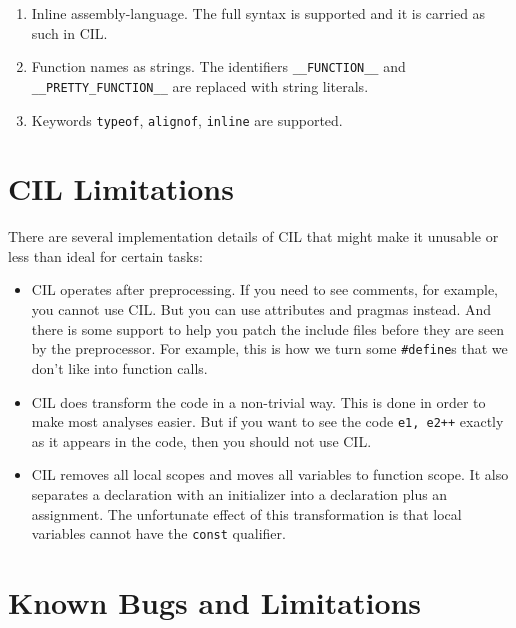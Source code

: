 \documentclass[letterpaper]{article}
\def\t#1{{\tt #1}}
\begin{document}
\begin{enumerate}
\item Inline assembly-language. The full syntax is supported and it is carried
as such in CIL.

\item Function names as strings. The identifiers \t{\_\_FUNCTION\_\_} and
\t{\_\_PRETTY\_FUNCTION\_\_} are replaced with string literals. 

\item Keywords \t{typeof}, \t{alignof}, \t{inline} are supported. 
\end{enumerate}

\section{CIL Limitations}

 There are several implementation details of CIL that might make it unusable
 or less than ideal for certain tasks:

\begin{itemize}
\item CIL operates after preprocessing. If you need to see comments, for
example, you cannot use CIL. But you can use attributes and pragmas instead.
And there is some support to help you patch the include files before they are
seen by the preprocessor. For example, this is how we turn some
\t{\#define}s that we don't like into function calls. 

\item CIL does transform the code in a non-trivial way. This is done in order
to make most analyses easier. But if you want to see the code \t{e1, e2++}
exactly as it appears in the code, then you should not use CIL. 

\item CIL removes all local scopes and moves all variables to function
scope. It also separates a declaration with an initializer into a declaration
plus an assignment. The unfortunate effect of this transformation is that
local variables cannot have the \t{const} qualifier.

\end{itemize}
 
\section{Known Bugs and Limitations}
\end{document}
